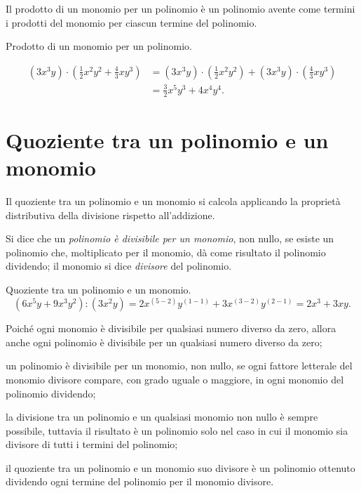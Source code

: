 \osservazione Il prodotto di un monomio per un polinomio è
un polinomio avente come termini i prodotti del monomio per ciascun
termine del polinomio.

\begin{exrig}
 \begin{esempio}
 Prodotto di un monomio per un polinomio.

 \begin{equation*}
\begin{split}
 \left(3x^{3}y\right)\cdot\left(\frac{1}{2}x^{2}y^{2}+\frac{4}{3}{xy}^{3}\right)&=\left(3x^{3}y\right)\cdot\left(\frac{1}{2}x^{2}y^{2}\right)+\left(3x^{3}y\right)\cdot%
\left(\frac{4}{3}{xy}^{3}\right)\\
&=\frac{3}{2}x^{5}y^{3}+4x^{4}y^{4}.
\end{split}
\end{equation*}
 \end{esempio}
\end{exrig}

\ovalbox{\risolvii \ref{ese:10.14}, \ref{ese:10.15}}

\section{Quoziente tra un polinomio e un monomio}

Il quoziente tra un polinomio e un monomio si calcola applicando la
proprietà distributiva della divisione rispetto
all'addizione.

\begin{definizione}
 Si dice che un \emph{polinomio è divisibile per un monomio}, non
nullo, se esiste un polinomio che, moltiplicato per il monomio, dà
come risultato il polinomio dividendo; il monomio si dice
\emph{divisore} del polinomio.
\end{definizione}

\begin{exrig}
 \begin{esempio}
 Quoziente tra un polinomio e un monomio.
 \[\left(6x^{5}y+9x^{3}y^{2}\right):\left(3x^{2}y\right)=2x^{(5-2)}y^{(1-1)}+3x^{(3-2)}y^{(2-1)}=2x^{3}+3{xy}.\]
 \end{esempio}
\end{exrig}
\osservazione

\begin{enumeratea}
\item Poiché ogni monomio è divisibile per qualsiasi numero diverso
da zero, allora anche ogni polinomio è divisibile per un qualsiasi
numero diverso da zero;
\item un polinomio è divisibile per un monomio, non nullo, se ogni
fattore letterale del monomio divisore compare, con grado uguale o
maggiore, in ogni monomio del polinomio dividendo;
\item la divisione tra un polinomio e un qualsiasi monomio non nullo è
sempre possibile, tuttavia il risultato è un polinomio solo nel caso
in cui il monomio sia divisore di tutti i termini del polinomio;
\item il quoziente tra un polinomio e un monomio suo divisore è un
polinomio ottenuto dividendo ogni termine del polinomio per il monomio
divisore.
\end{enumeratea}

